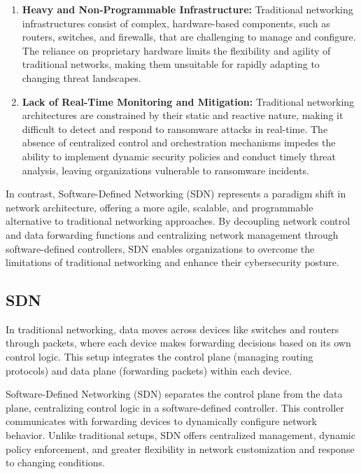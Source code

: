 \documentclass[12pt,letterpaper]{article}
\begin{document}
    \begin{enumerate}
        \item \textbf{Heavy and Non-Programmable Infrastructure:} Traditional networking infrastructures consist of complex, hardware-based components, such as routers, switches, and firewalls, that are challenging to manage and configure. The reliance on proprietary hardware limits the flexibility and agility of traditional networks, making them unsuitable for rapidly adapting to changing threat landscapes.

        \item \textbf{Lack of Real-Time Monitoring and Mitigation:} Traditional networking architectures are constrained by their static and reactive nature, making it difficult to detect and respond to ransomware attacks in real-time. The absence of centralized control and orchestration mechanisms impedes the ability to implement dynamic security policies and conduct timely threat analysis, leaving organizations vulnerable to ransomware incidents.
    \end{enumerate}

    In contrast, Software-Defined Networking (SDN) represents a paradigm shift in network architecture, offering a more agile, scalable, and programmable alternative to traditional networking approaches. By decoupling network control and data forwarding functions and centralizing network management through software-defined controllers, SDN enables organizations to overcome the limitations of traditional networking and enhance their cybersecurity posture.
    \clearpage
    \subsection{SDN}

    In traditional networking, data moves across devices like switches and routers through packets, where each device makes forwarding decisions based on its own control logic. This setup integrates the control plane (managing routing protocols) and data plane (forwarding packets) within each device. \cite{nadeau2013sdn}

    Software-Defined Networking (SDN) separates the control plane from the data plane, centralizing control logic in a software-defined controller. This controller communicates with forwarding devices to dynamically configure network behavior. Unlike traditional setups, SDN offers centralized management, dynamic policy enforcement, and greater flexibility in network customization and response to changing conditions.
\end{document}
